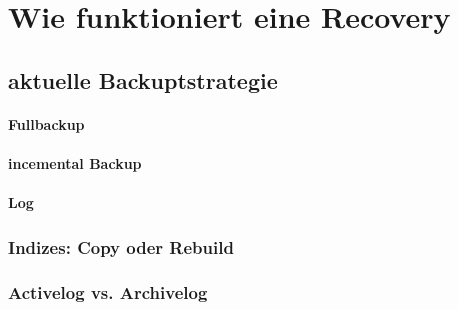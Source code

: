 \chapter[Recoverystrategie]{Wie funktioniert eine Recovery}

\section{aktuelle Backuptstrategie}

\subsubsection{Fullbackup}
\loreipsum

\subsubsection{incemental Backup}
\loreipsum

\subsubsection{Log}
\loreipsum

\subsection[Indizes]{Indizes: Copy oder Rebuild}
\loreipsum

\subsection{Activelog vs. Archivelog}
\loreipsum
